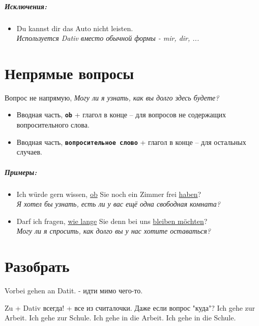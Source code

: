 \documentclass[12pt]{report}
\newcommand{\term}[1]{\texttt{\textbf{#1}}}
\newcommand{\satzew}[1]{\underline{#1}}
\newcommand{\ubersatze}[1]{\textit{#1}}
\begin{document}
\paragraph{Исключения:}
\begin{itemize}
\item Du  kannst dir das Auto nicht leisten.
~\\ \ubersatze{Используется Dativ вместо обычной формы - mir, dir, ...}
\end{itemize}

\chapter{Непрямые вопросы}
Вопрос не напрямую, \ubersatze{Могу ли я узнать, как вы долго здесь будете?}

\begin{itemize}
 \item Вводная часть, \term{ob} + глагол в конце -- для вопросов не содержащих вопросительного слова.
 \item Вводная часть, \term{вопросительное слово} + глагол в конце -- для остальных случаев.
\end{itemize}

\paragraph{Примеры:}
\begin{itemize}
 \item Ich würde gern wissen, \satzew{ob} Sie noch ein Zimmer frei \satzew{haben}? 
 ~\\ \ubersatze{Я хотел бы узнать, есть ли у вас ещё одна свободная комната?}
 \item Darf ich fragen, \satzew{wie lange} Sie denn bei uns \satzew{bleiben möchten}? 
 ~\\ \ubersatze{Могу ли я спросить, как долго вы у нас хотите оставаться?}
\end{itemize}

\chapter{Разобрать}
Vorbei gehen an Datit. - идти мимо чего-то.

Zu + Dativ всегда! + все из считалочки. Даже если вопрос "куда"? 
Ich gehe zur Arbeit. Ich gehe zur Schule.
Ich gehe in die Arbeit. Ich gehe in die Schule.
\end{document}
